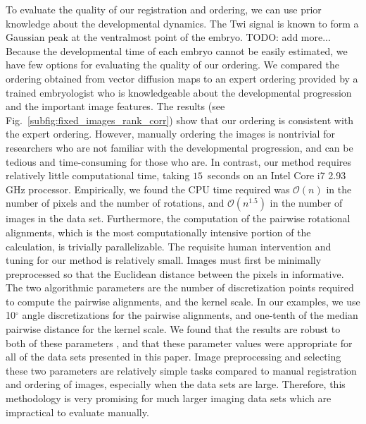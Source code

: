 \documentclass{pnastwo}
\newcommand{\fig}[0]{Fig.}
\begin{document}
\begin{article}
To evaluate the quality of our registration and ordering, we can use prior knowledge about the developmental dynamics. 
%
The Twi signal is known to form a Gaussian peak at the ventralmost point of the embryo. 
%
TODO: add more...
%
Because the developmental time of each embryo cannot be easily estimated, we have few options for evaluating the quality of our ordering. 
%
We compared the ordering obtained from vector diffusion maps to an expert ordering provided by a trained embryologist who is knowledgeable about the developmental progression and the important image features.  
%
The results (see \fig~\ref{subfig:fixed_images_rank_corr}) show that our ordering is consistent with the expert ordering. 
%
However, manually ordering the images is nontrivial for researchers who are not familiar with the developmental progression, and can be tedious and time-consuming for those who are.
%
In contrast, our method requires relatively little computational time, taking $15$~seconds on an Intel Core i7 2.93 GHz processor. %
%
Empirically, we found the CPU time required was $\mathcal{O}(n)$ in the number of pixels and the number of rotations, and $\mathcal{O}(n^{1.5})$ in the number of images in the data set.
%
Furthermore, the computation of the pairwise rotational alignments, which is the most computationally intensive portion of the calculation, is trivially parallelizable.
%
The requisite human intervention and tuning for our method is relatively small. 
%
Images must first be minimally preprocessed so that the Euclidean distance between the pixels in informative. 
%
%
The two algorithmic parameters are the number of discretization points required to compute the pairwise alignments, and the kernel scale.
%
In our examples, we use 10$^{\circ}$ angle discretizations for the pairwise alignments, and one-tenth of the median pairwise distance for the kernel scale. 
%
We found that the results are robust to both of these parameters%
, and that these parameter values were appropriate for all of the data sets presented in this paper. 
%
Image preprocessing and selecting these two parameters are relatively simple tasks compared to manual registration and ordering of images, especially when the data sets are large.  
%
Therefore, this methodology is very promising for much larger imaging data sets which are impractical to evaluate manually. 



\end{article}
\end{document}
